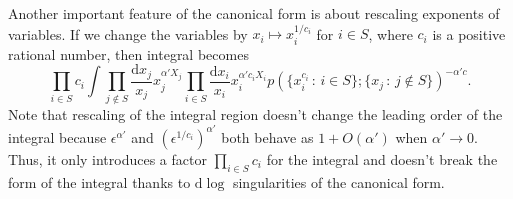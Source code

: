 \documentclass[12pt]{article}
\theoremstyle{definition}
\theoremstyle{plain}
\newcommand{\dif}{\mathrm{d}} %
\begin{document}

Another important feature of the canonical form is about rescaling exponents of variables.
If we change the variables by
\(
	x_i\mapsto x_i^{1/c_i}
\)
for $i\in S$, where $c_i$ is a positive rational number, then integral becomes
\[
	\prod_{i\in S}c_i\int
	\prod_{j\not\in S}\frac{\dif x_j}{x_j}x_j^{\alpha' X_j}
	\prod_{i\in S}\frac{\dif x_i}{x_i}x_i^{\alpha' c_iX_i}
	p(\{x_i^{c_i}\,:\, i\in S\};\{x_j\,:\, j\not\in S\})^{-\alpha' c}.
\]
Note that rescaling of the integral region doesn't change the leading order of the integral
because $\epsilon^{\alpha'}$ and $(\epsilon^{1/c_i})^{\alpha'}$ both behave as $1+O(\alpha')$
when $\alpha'\to 0$. Thus, it only introduces a factor $\prod_{i\in S}c_i$ 
for the integral and doesn't break the form of the integral 
thanks to $\dif \log$ singularities of the canonical form.
\end{document}
